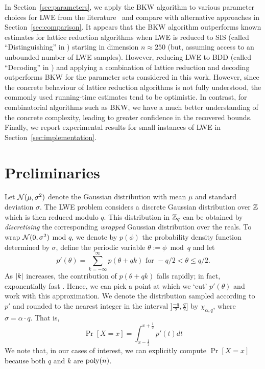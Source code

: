 In Section~\ref{sec:parameters}, we apply the BKW algorithm to various parameter choices for LWE from the literature~\cite{regev:acm09,LindnerP10,albrecht-farshim-faugere-perret:asiacrypt2011} and compare with alternative approaches in Section~\ref{sec:comparison}. It appears that the BKW algorithm outperforms known estimates for lattice reduction algorithms when LWE is reduced to SIS (called ``Distinguishing'' in \cite{LindnerP10}) starting in dimension $n \approx 250$ (but, assuming access to an unbounded number of LWE samples). However, reducing LWE to BDD (called ``Decoding'' in \cite{LindnerP10}) and applying a combination of lattice reduction and decoding outperforms BKW for the parameter sets considered in this work.  However, since the concrete behaviour of lattice reduction algorithms is not fully understood, the commonly used running-time estimates tend to be optimistic. In contrast, for combinatorial algorithms such as BKW, we have a much better understanding of the concrete complexity, leading to greater confidence in the recovered bounds. Finally, we report experimental results for small instances of LWE in Section~\ref{sec:implementation}.

\section{Preliminaries}
\label{sec:preliminaries}
 Let $\mathcal{N}({\mu,\sigma^2)}$ denote the Gaussian distribution with mean $\mu$ and standard deviation $\sigma$.
The LWE problem considers a discrete Gaussian distribution over $\mathbb{Z}$ which is then reduced modulo $q$. This distribution in $\mathbb{Z}_q$ can be obtained by \emph{discretising} the corresponding \emph{wrapped} Gaussian distribution over the reals. To wrap $\mathcal{N}({0,\sigma^2)}$ mod $q$, we denote by $p(\phi)$ the probability density function determined by $\sigma$, define the periodic variable $\theta := \phi \bmod q$ and let
\begin{equation}
p'(\theta)=\sum_{k=-\infty}^{\infty}{p(\theta+qk)} \mbox{ for } -q/2 < \theta \leq q/2.
\end{equation}
As $|k|$ increases, the contribution of $p(\theta + qk)$ falls rapidly; in fact, exponentially fast \cite{duembgen-arxiv2010}. Hence, we can pick a point at which we `cut' $p'(\theta)$ and work with this approximation. We denote the distribution sampled according to $p'$ and rounded to the nearest integer in the interval $]\frac{-q}{2},\frac{q}{2}]$ by $\chi_{\alpha,q}$, where $\sigma = \alpha \cdot q$.
That is, 
\begin{equation}
\Pr[X=x]=\int_{x-\frac{1}{2}}^{x+\frac{1}{2}}{p'(t)} dt 
\end{equation}
 We note that, in our cases of interest, we can explicitly compute $\Pr[X=x]$ because both $q$ and $k$ are ${\rm poly}(n)$.

